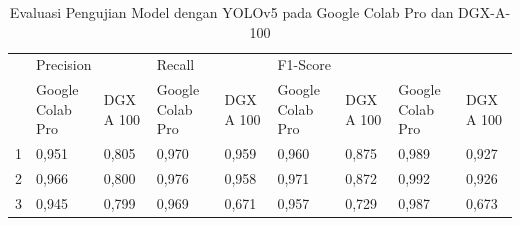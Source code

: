\begin{singlespace}
	\begin{table}[H]
		\centering
		\caption{Evaluasi Pengujian Model dengan YOLOv5 pada Google Colab Pro dan DGX-A-100}
		\label{tbl:Evaluasi-Pengujian-Model-Dengan-YOLOv5-Colab-DGX}
		\begin{tabular}{|p{1cm}|p{1cm}p{1cm}|p{1cm}p{1cm}|p{1cm}p{1cm}|p{1cm}p{1cm}|}
			\hline
			\rowcolor[HTML]{D9D9D9} 
			\cellcolor[HTML]{D9D9D9}                       & \multicolumn{2}{p{1cm}|}{\cellcolor[HTML]{D9D9D9}Precision}                    & \multicolumn{2}{p{1cm}|}{\cellcolor[HTML]{D9D9D9}Recall}                       & \multicolumn{2}{p{1cm}|}{\cellcolor[HTML]{D9D9D9}F1-Score}                     & \multicolumn{2}{p{1cm}|}{\cellcolor[HTML]{BFBFBF}{\color[HTML]{333333} mAP@.5}} \\ \cline{2-9} 
			\rowcolor[HTML]{D9D9D9} 
			\multirow{-2}{*}{\cellcolor[HTML]{D9D9D9}Fold} & \multicolumn{1}{p{1cm}|}{\cellcolor[HTML]{D9D9D9}Google Colab Pro} & DGX A 100 & \multicolumn{1}{p{1cm}|}{\cellcolor[HTML]{D9D9D9}Google Colab Pro} & DGX A 100 & \multicolumn{1}{p{1cm}|}{\cellcolor[HTML]{D9D9D9}Google Colab Pro} & DGX A 100 & \multicolumn{1}{p{1cm}|}{\cellcolor[HTML]{D9D9D9}Google Colab Pro}  & DGX A 100 \\ \hline
			
			1                                              & \multicolumn{1}{p{1cm}|}{0,951}                                    & 0,805     & \multicolumn{1}{p{1cm}|}{0,970}                                    & 0,959     & \multicolumn{1}{p{1cm}|}{0,960}                                    & 0,875     & \multicolumn{1}{p{1cm}|}{0,989}                                     & 0,927     \\ \hline
			
			2                                              & \multicolumn{1}{p{1cm}|}{0,966}                                    & 0,800     & \multicolumn{1}{p{1cm}|}{0,976}                                    & 0,958     & \multicolumn{1}{p{1cm}|}{0,971}                                    & 0,872     & \multicolumn{1}{p{1cm}|}{0,992}                                     & 0,926     \\ \hline
			
			3                                              & \multicolumn{1}{p{1cm}|}{0,945}                                    & 0,799     & \multicolumn{1}{p{1cm}|}{0,969}                                    & 0,671     & \multicolumn{1}{p{1cm}|}{0,957}                                    & 0,729     & \multicolumn{1}{p{1cm}|}{0,987}                                     & 0,673     \\ \hline
			

\end{tabular}
\end{table}
\end{singlespace}

